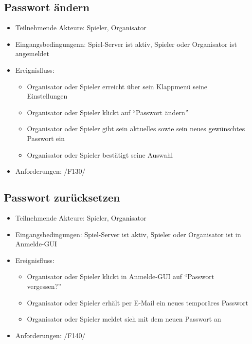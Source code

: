 \documentclass[a4paper]{scrreprt}
\begin{document}
    \subsection{Passwort ändern}
    \begin{itemize}
    \item Teilnehmende Akteure: \Gls{Spieler}, \Gls{Organisator}
    \item Eingangsbedingungenn: \Gls{Spiel-Server} ist aktiv, \Gls{Spieler} oder \Gls{Organisator} ist angemeldet
    \item Ereignisfluss:
        \begin{itemize}
            \item \Gls{Organisator} oder \Gls{Spieler} erreicht über sein Klappmenü seine Einstellungen
            \item \Gls{Organisator} oder \Gls{Spieler} klickt auf \enquote{Passwort ändern}
            \item \Gls{Organisator} oder \Gls{Spieler} gibt sein aktuelles sowie sein neues gewünschtes Passwort ein
            \item \Gls{Organisator} oder \Gls{Spieler} bestätigt seine Auswahl
        \end{itemize}
        \item Anforderungen: /F130/
    \end{itemize}

    \subsection{Passwort zurücksetzen}
    \begin{itemize}
        \item Teilnehmende Akteure: \Gls{Spieler}, \Gls{Organisator}
        \item Eingangsbedingungen: \Gls{Spiel-Server} ist aktiv, \Gls{Spieler} oder \Gls{Organisator} ist in Anmelde-GUI
        \item Ereignisfluss:
        \begin{itemize}
            \item \Gls{Organisator} oder \Gls{Spieler} klickt in Anmelde-GUI auf \enquote{Passwort vergessen?}
            \item \Gls{Organisator} oder \Gls{Spieler} erhält per E-Mail ein neues temporäres Passwort
            \item \Gls{Organisator} oder \Gls{Spieler} meldet sich mit dem neuen Passwort an
        \end{itemize}
        \item Anforderungen: /F140/
    \end{itemize}
\end{document}
